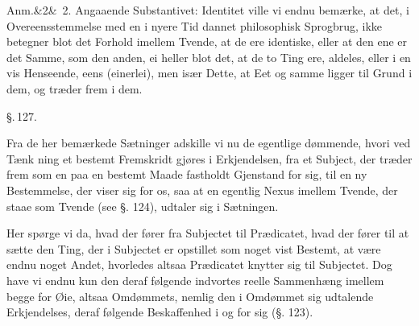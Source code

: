 \documentclass[12pt]{book}
\def\sperr#1{#1}%
\def\textit#1{#1}%
\newcommand{\sperr}[1]{\textls[180]{#1}}
\newcommand{\parag}[1]{%
  \par\vspace{0.9\baselineskip}%
  {\centering\textit{\S.\,#1.}\par}%
  \vspace{0.35\baselineskip}%
  \noindent\hspace{\parindent}\ignorespaces
}
\newcommand{\anm}[1]{%
  \par\vspace{0.5\baselineskip}%
  \noindent\hspace{\parindent}\sperr{Anm.}\ifx&#1&\else~\textit{#1}.\fi
  \enspace\ignorespaces
}
\newcommand{\opage}[1]{\marginnote{\footnotesize\textit{[#1]}}}
\begin{document}
\anm{2} Angaaende Substantivet: Identitet ville vi endnu bemærke, at det, i
Overeensstemmelse med en i nyere Tid dannet philosophisk Sprogbrug, ikke
betegner blot det Forhold imellem Tvende, at de ere identiske, eller at den ene
er det Samme, som den anden, ei heller blot det, at de to Ting ere, aldeles,
eller i en vis Henseende, eens (\textit{einerlei}), men især Dette, at Eet og
samme ligger til Grund i dem, og træder frem i dem.

\parag{127}

Fra de her bemærkede Sætninger adskille vi nu de egentlige dømmende, hvori ved
Tænk%
\opage{305}ning et bestemt Fremskridt gjøres i Erkjendelsen, fra et Subject, der træder frem
som en paa en bestemt Maade fastholdt Gjenstand for sig, til en ny Bestemmelse,
der viser sig for os, saa at en egentlig Nexus imellem Tvende, der staae som
Tvende (see §. 124), udtaler sig i Sætningen.

Her spørge vi da, hvad der fører fra Subjectet til Prædicatet, hvad der fører til
at sætte den Ting, der i Subjectet er opstillet som noget vist Bestemt, at være
endnu noget Andet, hvorledes altsaa Prædicatet knytter sig til Subjectet. Dog
have vi endnu kun den deraf følgende indvortes reelle Sammenhæng imellem begge
for Øie, altsaa Omdømmets, nemlig den i Omdømmet sig udtalende Erkjendelses,
deraf følgende Beskaffenhed i og for sig (§. 123).
\end{document}
